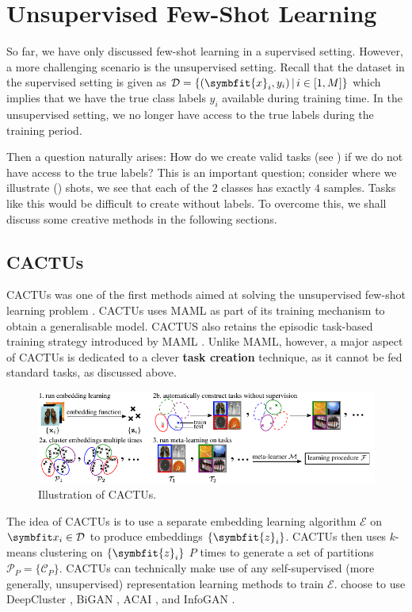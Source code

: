 \section{Unsupervised Few-Shot Learning}\label{sec:u-fsl}

So far, we have only discussed few-shot learning in a supervised setting. However, a more challenging scenario is the unsupervised setting. Recall that the dataset in the supervised setting is given as \(\mathcal{D} = \left\{(\symbfit{x}_i, y_i)\, |\, i \in [1,M]\right\}\) which implies that we have the true class labels $y_i$ available during training time. In the unsupervised setting, we no longer have access to the true labels during the training period. 

Then a question naturally arises: How do we create valid tasks (see ) if we do not have access to the true labels? This is an important question; consider  where we illustrate () shots, we see that each of the $2$ classes has exactly $4$ samples. Tasks like this would be difficult to create without labels. To overcome this, we shall discuss some creative methods in the following sections.

\subsection{CACTUs}\label{ssec:ufsl-cactus}
CACTUs was one of the first methods aimed at solving the unsupervised few-shot learning problem \parencite{Hsu2018UnsupervisedMeta-Learning}. CACTUs uses MAML as part of its training mechanism to obtain a generalisable model. CACTUS also retains the episodic task-based training strategy introduced by MAML \parencite{Finn2017Model-agnosticNetworks}. Unlike MAML, however, a major aspect of CACTUs is dedicated to a clever \textbf{task creation} technique, as it cannot be fed standard tasks, as discussed above.
\begin{figure}[ht]
    \centering
    \includegraphics[width=\linewidth]{chapters/assets/fsl/cactus.pdf}
    \caption{Illustration of CACTUs. }
    \label{fig:cactus}
\end{figure}
The idea of CACTUs is to use a separate embedding learning algorithm $\mathcal{E}$ on $\bfitx_i \in \mathcal{D}$ to produce embeddings $\{\symbfit{z}_i\}$. CACTUs then uses $k$-means clustering on $\{\symbfit{z}_i\}$ $P$ times to generate a set of partitions $\mathcal{P}_P = \{\mathcal{C}_P\}$. CACTUs can technically make use of any self-supervised (more generally, unsupervised) representation learning methods to train $\mathcal{E}$. \textcite{Hsu2018UnsupervisedMeta-Learning} choose to use DeepCluster \parencite{caron2018deep}, BiGAN \parencite{berthelot2018understanding}, ACAI \parencite{donahue2016adversarial}, and InfoGAN \parencite{chen2016infogan}. 


